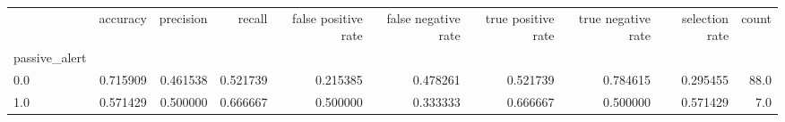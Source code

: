 \begin{tabular}{lrrrrrrrrr}
\toprule
{} &  accuracy &  precision &    recall &  false positive rate &  false negative rate &  true positive rate &  true negative rate &  selection rate &  count \\
passive\_alert &           &            &           &                      &                      &                     &                     &                 &        \\
\midrule
0.0           &  0.715909 &   0.461538 &  0.521739 &             0.215385 &             0.478261 &            0.521739 &            0.784615 &        0.295455 &   88.0 \\
1.0           &  0.571429 &   0.500000 &  0.666667 &             0.500000 &             0.333333 &            0.666667 &            0.500000 &        0.571429 &    7.0 \\
\bottomrule
\end{tabular}
